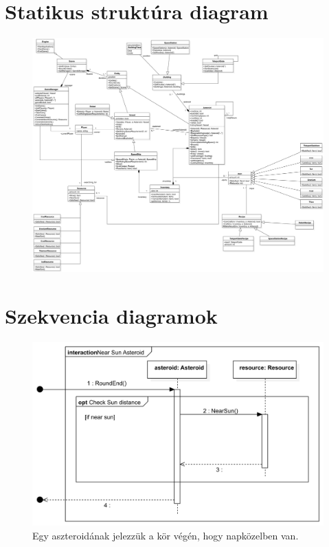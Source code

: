 \section{Statikus struktúra diagram}
\begin{figure}[H] 
\centering 
\includegraphics[width=1\textwidth]{docs/3_Project/svg/Design Model!Classes_1.png} 
\end{figure} 

\section{Szekvencia diagramok}
\begin{figure}[H] 
\centering 
\includegraphics[width=1\textwidth]{docs/3_Project/svg/Design Model!Sun Distance!Asteroid near sun!Near Sun Asteroid_6.png} 
\caption{Egy aszteroidának jelezzük a kör végén, hogy napközelben van.} 
\end{figure} 

